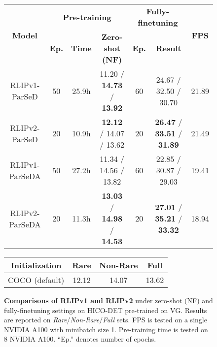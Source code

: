 \begin{figure*}[t]
{\renewcommand{\arraystretch}{0.9}
\begin{minipage}[l]{0.63\textwidth}
  \small
\setlength{\tabcolsep}{2pt}
  \centering
    \begin{tabular}{c|ccc|cc|c}
    \toprule
    \multirow{2}[2]{*}{\textbf{Model}} & \multicolumn{3}{c|}{\textbf{Pre-training}} & \multicolumn{2}{c|}{\textbf{Fully-finetuning}} & \multirow{2}[2]{*}{\textbf{FPS}} \\
& \textbf{Ep.} & \textbf{Time} & \textbf{Zero-shot (NF)} & \textbf{Ep.} & \textbf{Result} &  \\
    \midrule
    RLIPv1-ParSeD & 50    & 25.9h  & 11.20 / \textbf{14.73} / \textbf{13.92} & 60    & 24.67 / 32.50 / 30.70 & 21.89 \\
    \rowcolor{mygray}  RLIPv2-ParSeD & 20    & 10.9h  & \textbf{12.12} / 14.07 / 13.62 & 20    & \textbf{26.47} / \textbf{33.51} / \textbf{31.89} & 21.49 \\
    \midrule
    RLIPv1-ParSeDA & 50    & 27.2h  & 11.34 / 14.56 / 13.82 & 60    & 22.85 / 30.87 / 29.03 & 19.41 \\
    \rowcolor{mygray}  RLIPv2-ParSeDA & 20    & 11.3h  & \textbf{13.03} / \textbf{14.98} / \textbf{14.53} & 20    & \textbf{27.01} / \textbf{35.21} / \textbf{33.32} & 18.94 \\
    \bottomrule
    \end{tabular}
    \vspace{-.1cm}
    \makeatletter{}\makeatother\caption{\small \textbf{Comparisons of RLIPv1 and RLIPv2} under zero-shot (NF) and fully-finetuning settings on HICO-DET pre-trained on VG. Results are reported on \textit{Rare}/\textit{Non-Rare}/\textit{Full} sets. FPS is tested on a single NVIDIA A100 with minibatch size 1. Pre-training time is tested on 8 NVIDIA A100. ``Ep.'' denotes number of epochs. }
    \vspace{-.2cm}
  \label{tab:RLIPv1_and_RLIPv2}\end{minipage}}
\hspace{2pt}
{\renewcommand{\arraystretch}{0.9}
\begin{minipage}[r]{0.35\textwidth}
\setlength{\tabcolsep}{3pt}
  \centering
    \begin{tabular}{c|ccc}
    \toprule
    \textbf{Initialization} & \textbf{Rare} & \textbf{Non-Rare} & \textbf{Full} \\
    \midrule
    \midrule
    COCO (default) & 12.12  & 14.07  & 13.62  \\

\end{tabular}
\end{minipage}}
\end{figure*}
